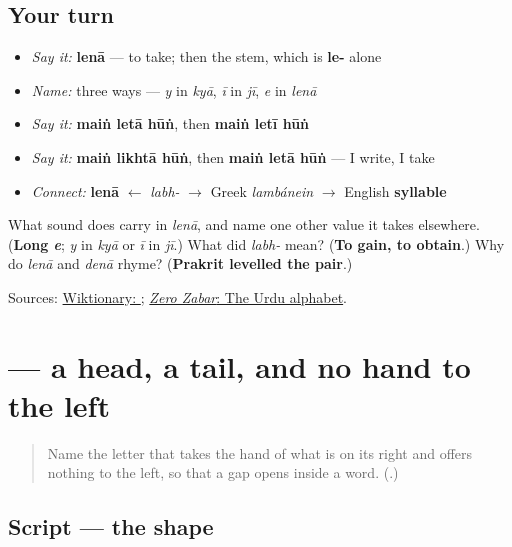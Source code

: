\subsection*{Your turn}
\begin{itemize}
\raggedright
  \item \emph{Say it:} \textbf{lenā} — to take; then the stem, which is \textbf{le-} alone
  \item \emph{Name:} \textbf{} three ways — \emph{y} in \emph{kyā}, \emph{ī} in \emph{jī}, \emph{e} in \emph{lenā}
  \item \emph{Say it:} \textbf{maiṅ letā hūṅ}, then \textbf{maiṅ letī hūṅ}
  \item \emph{Say it:} \textbf{maiṅ likhtā hūṅ}, then \textbf{maiṅ letā hūṅ} — I write, I take
  \item \emph{Connect:} \textbf{lenā} $\leftarrow$ \emph{labh-} $\to$ Greek \emph{lambánein} $\to$ English \textbf{syllable}
\end{itemize}

\begin{tcolorbox}[breakable,colback=teal!4,colframe=teal!35!black,title={Before you move on}]
What sound does \textbf{} carry in \emph{lenā}, and name one other value it takes elsewhere. (\textbf{Long \emph{e}}; \emph{y} in \emph{kyā} or \emph{ī} in \emph{jī}.) What did \emph{labh-} mean? (\textbf{To gain, to obtain}.) Why do \emph{lenā} and \emph{denā} rhyme? (\textbf{Prakrit levelled the pair}.)

Sources: \href{https://en.wiktionary.org/wiki/\%D9\%84\%DB\%8C\%D9\%86\%D8\%A7}{Wiktionary: }; \href{https://openbooks.library.northwestern.edu/zerozabar/chapter/the-urdu-alphabet/}{\emph{Zero Zabar}: The Urdu alphabet}.
\end{tcolorbox}
\section[\texorpdfstring{\ur{و} (vāʾo)}{و (vāʾo)}]{ — a head, a tail, and no hand to the left}

\label{lesson:UR-W08-vao}



\begin{quote}
Name the letter that takes the hand of what is on its right and offers nothing to the left, so that a gap opens inside a word. (\textbf{}.)
\end{quote}

\subsection*{Script — the shape}

